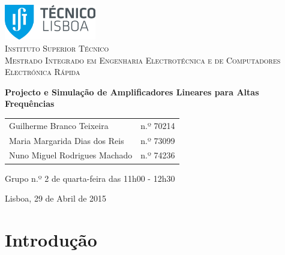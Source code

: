 \documentclass[11pt]{article}
\numberwithin{equation}{section}
\begin{document}
\begin{titlepage}
\begin{center}

\hfill \break
\hfill \break

\includegraphics[width=0.3\textwidth]{./logo}~\\[1cm] 

\textsc{\LARGE Instituto Superior Técnico}\\[0.25cm]
\textsc{\Large Mestrado Integrado em Engenharia Electrotécnica e de Computadores}\\[1.8cm]
\textsc{\huge Electrónica Rápida}\\[0.25cm]

\vspace{6mm}

{\huge \bfseries Projecto e Simulação de Amplificadores Lineares para Altas Frequências\\[1cm]}

\begin{tabular}{ l l }
Guilherme Branco Teixeira & \hspace{2mm} n.º 70214 \\
Maria Margarida Dias dos Reis & \hspace{2mm} n.º 73099 \\
Nuno Miguel Rodrigues Machado & \hspace{2mm} n.º 74236
\end{tabular}

\vspace{7mm}

Grupo n.º 2 de quarta-feira das 11h00 - 12h30

\vfill

{\large Lisboa, 29 de Abril de 2015} 

\end{center}
\end{titlepage}

\clearpage

\tableofcontents
\pagebreak

\clearpage
{}

\section{Introdução}
\end{document}
